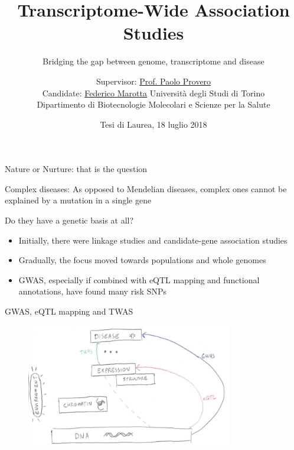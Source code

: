 \documentclass[aspectratio=169,12pt]{beamer}
\title{Transcriptome-Wide Association Studies}
\subtitle{\normalsize Bridging the gap between genome, transcriptome and 
disease}
\author[Federico Marotta]
{
	\footnotesize
	Supervisor: \href{mailto:paolo.provero@unito.it}{Prof. Paolo 
		Provero}
	\\
	Candidate: \href{mailto:federico.marotta@edu.unito.it}{Federico 
		Marotta}
	\vfill
	\scriptsize
	Università degli Studi di Torino
	\\
	Dipartimento di Biotecnologie Molecolari e Scienze per la Salute
	\vfill
}
\institute[UniTo, DBMSS]
{



}
\date{\tiny Tesi di Laurea, 18 luglio 2018}
\begin{document}
\maketitle


\begin{frame}{Nature or Nurture: that is the question}

	\bigskip

	\begin{block}{Complex diseases:}
		As opposed to Mendelian diseases, complex ones cannot be 
explained by a mutation in a single gene
	\end{block}

	\bigskip

	Do they have a genetic basis at all?

	\pause

	\begin{itemize}
		\item Initially, there were \alert{linkage studies} and 
			\alert{candidate-gene association studies}
		\item Gradually, the focus moved towards \alert{populations and 
				whole genomes}
		\item \alert{GWAS}, especially if combined with eQTL mapping and 
			functional annotations, have found many risk SNPs
	 \end{itemize}


\end{frame}

\begin{frame}{GWAS, eQTL mapping and TWAS}

	\begin{figure}
		\includegraphics[width=0.8\textwidth]{introduction/summary}
	\end{figure}

\end{frame}
\end{document}
